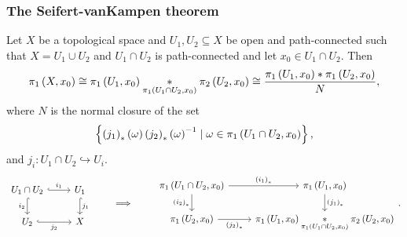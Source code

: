 \subsubsection{The Seifert-vanKampen theorem}

\begin{theorem}
Let $ X $ be a topological space and $ U_1, U_2 \subseteq X $ be open and path-connected such that $ X = U_1 \cup U_2 $ and $ U_1 \cap U_2 $ is path-connected and let $ x_0 \in U_1 \cap U_2 $. Then
$$ \pi_1\left( X, x_0 \right) \cong \pi_1\left( U_1, x_0 \right) \underset{\pi_1\left( U_1 \cap U_2, x_0 \right)}{*} \pi_2\left( U_2, x_0 \right) \cong \dfrac{\pi_1\left( U_1, x_0 \right) * \pi_1\left( U_2, x_0 \right)}{N}, $$
where $ N $ is the normal closure of the set
$$ \left\{ \left( j_1 \right)_*\left( \omega \right)\left( j_2 \right)_*\left( \omega \right)^{-1} \mid \omega \in \pi_1\left( U_1 \cap U_2, x_0 \right) \right\}, $$
and $ j_i : U_1 \cap U_2 \hookrightarrow U_i $.
$$
\begin{tikzcd}
U_1 \cap U_2 \arrow[hookrightarrow]{r}{i_1} \arrow[hookrightarrow, swap]{d}{i_2} & U_1 \arrow[hookrightarrow]{d}{j_1} \\
U_2 \arrow[hookrightarrow, swap]{r}{j_2} & X
\end{tikzcd}
\qquad \implies \qquad
\begin{tikzcd}
\pi_1\rb{U_1 \cap U_2, x_0} \arrow{r}{\rb{i_1}_*} \arrow[swap]{d}{\rb{i_2}_*} & \pi_1\rb{U_1, x_0} \arrow{d}{\rb{j_1}_*} \\
\pi_1\rb{U_2, x_0} \arrow[swap]{r}{\rb{j_2}_*} & \pi_1\rb{U_1, x_0} \underset{\pi_1\rb{U_1 \cap U_2, x_0}}{*} \pi_2\rb{U_2, x_0}
\end{tikzcd}.
$$
\end{theorem}

